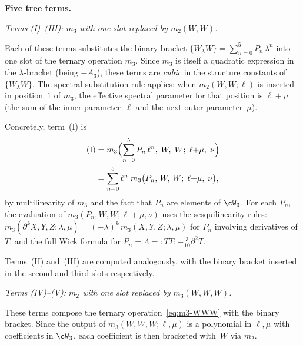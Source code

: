 \medskip
\noindent\textbf{Five tree terms.}

\smallskip
\emph{Terms (I)--(III): $m_3$ with one slot replaced by $m_2(W,W)$.}

Each of these terms substitutes the binary bracket
$\{W_\lambda W\} = \sum_{n=0}^5 P_n\,\lambda^n$ into one slot of
the ternary operation $m_3$. Since $m_3$ is itself a quadratic
expression in the $\lambda$-bracket (being $-A_3$), these terms
are \emph{cubic} in the structure constants of $\{W_\lambda W\}$.
The spectral substitution rule applies: when $m_2(W,W;\ell)$ is
inserted in position~$1$ of $m_3$, the effective spectral parameter
for that position is $\ell + \mu$ (the sum of the inner
parameter~$\ell$ and the next outer parameter~$\mu$).

Concretely, term~(I) is
\begin{align}
\label{eq:term-I}
\mathrm{(I)} &=
m_3\Bigl(\sum_{n=0}^{5} P_n\,\ell^n,\; W,\; W;\;
 \ell{+}\mu,\; \nu\Bigr) \notag\\
&= \sum_{n=0}^{5} \ell^n\;
 m_3\bigl(P_n,\, W,\, W;\; \ell{+}\mu,\; \nu\bigr),
\end{align}
by multilinearity of $m_3$ and the fact that
$P_n$ are elements of $\cW_3$. For each $P_n$, the evaluation of
$m_3(P_n, W, W; \ell{+}\mu, \nu)$ uses the sesquilinearity rules:
$m_3(\partial^k X, Y, Z; \lambda, \mu)
 = (-\lambda)^k\, m_3(X, Y, Z; \lambda, \mu)$
for $P_n$ involving derivatives of $T$, and the full Wick formula
for $P_n = \Lambda = {:}TT{:} - \tfrac{3}{10}\partial^2 T$.

Terms~(II) and~(III) are computed analogously, with the
binary bracket inserted in the second and third slots respectively.

\smallskip
\emph{Terms (IV)--(V): $m_2$ with one slot replaced by $m_3(W,W,W)$.}

These terms compose the ternary operation~\eqref{eq:m3-WWW} with
the binary bracket. Since the output of $m_3(W,W,W;\ell,\mu)$
is a polynomial in $\ell, \mu$ with coefficients in $\cW_3$, each
coefficient is then bracketed with~$W$ via $m_2$.

